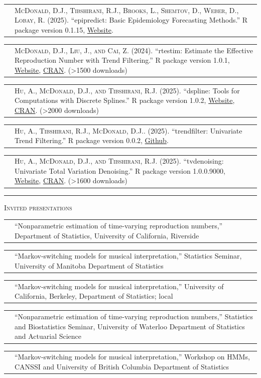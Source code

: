 \documentclass[11pt,letterpaper]{minimal/moderncv}
\makeatletter
\renewcommand{\section}[1]{  \par\addvspace{15pt}%
  \parbox[t]{\hintscolumnwidth}{\strut\raggedleft\raisebox{4pt}%
  {\rule{\hintscolumnwidth}{2pt}}}%
  \hspace{\separatorcolumnwidth}%
  \textsc{\Large #1}\par\nobreak\addvspace{6pt}%
}
\renewcommand*{\cvitem}[2]{%
  \begin{tabular}{@{}p{\hintscolumnwidth}@{\hspace{\separatorcolumnwidth}}%
    p{\maincolumnwidth}@{}}%
    \raggedleft {#1} &  {#2}%
  \end{tabular}%
}
\makeatother
\begin{document}
\cvitem{}{\textsc{%
McDonald, D.J., Tibshirani, R.J., Brooks, L., Shemtov, D., Weber, D., Lobay, R}.
(2025). ``epipredict: Basic Epidemiology Forecasting Methods.'' 
\textsf{R} package version 0.1.15,
\href{https://cmu-delphi.github.io/epipredict/}{Website}.
\vspace*{6pt}}

\cvitem{}{\textsc{%
McDonald, D.J., Liu, J., and Cai, Z}. (2024). ``rtestim: Estimate the
Effective Reproduction Number with Trend Filtering.'' \textsf{R} package version
1.0.1, \href{https://dajmcdon.github.io/rtestim/}{Website},
\href{https://cran.r-project.org/package=rtestim}{CRAN}. (>1500 downloads)
\vspace*{6pt}}

\cvitem{}{\textsc{%
Hu, A., McDonald, D.J., and Tibshirani, R.J}. (2025). ``dspline: Tools
for Computations with Discrete Splines.'' \textsf{R} package version 1.0.2,
\href{https://glmgen.github.io/dspline/}{Website},
\href{https://cran.r-project.org/package=dspline}{CRAN}. (>2000 downloads)
\vspace*{6pt}}

\cvitem{}{\textsc{%
Hu, A., Tibshirani, R.J., McDonald, D.J.}. (2025). ``trendfilter: Univariate
Trend Filtering.'' \textsf{R} package version 0.0.2, 
\href{https://github.com/glmgen/trendfilter/}{Github}.
\vspace*{6pt}}

\cvitem{}{\textsc{%
Hu, A., McDonald, D.J., and Tibshirani, R.J}. (2025). ``tvdenoising: Univariate
Total Variation Denoising.'' \textsf{R} package version 1.0.0.9000, 
\href{https://glmgen.github.io/tvdenoising/}{Website},
\href{https://cran.r-project.org/package=tvdenoising}{CRAN}. (>1600 downloads)} 


    

\section{Invited presentations}

\cvitem{2026}{``Nonparametric estimation of time-varying reproduction numbers,'' Department of Statistics, University of California, Riverside}
\cvitem{2025}{``Markov-switching models for musical interpretation,'' Statistics Seminar, University of Manitoba Department of Statistics}
\cvitem{}{``Markov-switching models for musical interpretation,'' University of California, Berkeley, Department of Statistics; local}
\cvitem{}{``Nonparametric estimation of time-varying reproduction numbers,'' Statistics and Biostatistics Seminar, University of Waterloo Department of Statistics and Actuarial Science}
\cvitem{}{``Markov-switching models for musical interpretation,'' Workshop on HMMs, CANSSI and University of British Columbia Department of Statistics
}
\end{document}
